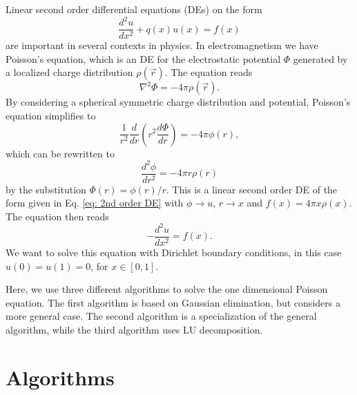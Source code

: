 \documentclass[%
 reprint,
nofootinbib,
 amsmath,amssymb,
 aps,
]{revtex4-1}
\begin{document}
Linear second order differential equations (DEs) on the form
\begin{equation}\label{eq: 2nd order DE}
\frac{d^2 u}{dx^2} + q(x) u(x) = f(x)
\end{equation}
are important in several contexts in physics. In electromagnetism we have Poisson's equation, which is an DE for the electrostatic potential $\Phi$ generated by a localized charge distribution $\rho(\vec{r})$. The equation reads
\begin{equation}
\nabla^2\Phi = -4\pi\rho(\vec{r}).
\end{equation}
By considering a spherical symmetric charge distribution and potential, Poisson's equation simplifies to
\begin{equation}
\frac{1}{r^2}\frac{d}{dr}\left( r^2 \frac{d\Phi}{dr} \right) = -4\pi\phi(r),
\end{equation}
which can be rewritten to
\begin{equation}
\frac{d^2\phi}{dr^2} = -4\pi r \rho(r)
\end{equation}
by the substitution $\Phi(r) = \phi(r)/r$.
This is a linear second order DE of the form given in Eq. \eqref{eq: 2nd order DE} with $\phi \rightarrow u$, $r \rightarrow x$ and $f(x) = 4\pi x \rho(x)$. The equation then reads
\begin{equation}
-\frac{d^2 u}{dx^2} = f(x).
\end{equation}
We want to solve this equation with Dirichlet boundary conditions, in this case $u(0) = u(1) = 0$, for $x \in [0,1]$.

Here, we use three different algorithms to solve the one dimensional Poisson equation. The first algorithm is based on Gaussian elimination, but considers a more general case. The second algorithm is a specialization of the general algorithm, while the third algorithm uses LU decomposition.


\section{Algorithms}
\end{document}
